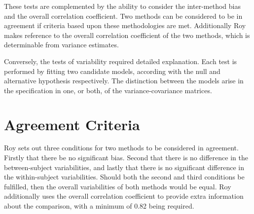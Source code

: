 \documentclass[12pt, a4paper]{report}
\theoremstyle{plain}
\theoremstyle{definition}
\theoremstyle{remark}
\begin{document}






These tests are complemented by the ability to consider the inter-method bias and the overall correlation coefficient.
Two methods can be considered to be in agreement if criteria based upon these methodologies are met. Additionally Roy makes reference to the overall correlation coefficient of the two methods, which is determinable from variance estimates.

Conversely, the tests of variability required detailed explanation. Each test is performed by fitting two candidate models, according with the null and alternative hypothesis respectively. The distinction between the models arise in the specification in one, or both, of the variance-covariance matrices. %





\section{Agreement Criteria}	

Roy sets out three conditions for two methods to be considered in agreement. Firstly that there be no significant bias. Second that there is no difference in the between-subject variabilities, and lastly that there is no significant difference in the within-subject variabilities. Should both the second and third conditions be fulfilled, then the overall variabilities of both methods would be equal. Roy additionally uses the overall correlation coefficient to provide extra information about the comparison, with a minimum of 0.82 being required.
\end{document}
